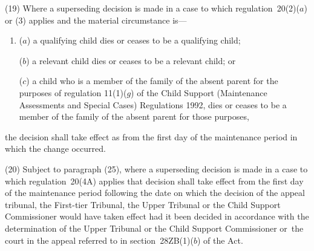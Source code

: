 \documentclass[a4paper,12pt]{article}
\begin{document}

%

(19) Where a superseding decision is made in a case to which regulation~20(2)($a$)  or (3) applies and the material circumstance is---
\begin{enumerate}\item[]
($a$) a qualifying child dies or ceases to be a qualifying child;

($b$) a relevant child dies or ceases to be a relevant child; or

($c$) a child who is a member of the family of the absent parent for the purposes of regulation 11(1)($g$)  of the Child Support (Maintenance Assessments and Special Cases) Regulations 1992, dies or ceases to be a member of the family of the absent parent for those purposes,
\end{enumerate}
the decision shall take effect as from the first day of the maintenance period in which the change occurred.

(20) 
Subject to paragraph (25),  %
where a superseding decision is made in a case to which regulation~20(4A) applies that decision shall take effect from the first day of the maintenance period following the date on which the 
decision of the appeal tribunal, the First-tier Tribunal, the Upper Tribunal or the Child Support Commissioner  %
would have taken effect had it been decided in accordance with the determination of the 
Upper Tribunal  %
or the Child Support Commissioner  %
or~the court in the appeal referred to in section~28ZB(1)($b$)  of the Act.
\end{document}
